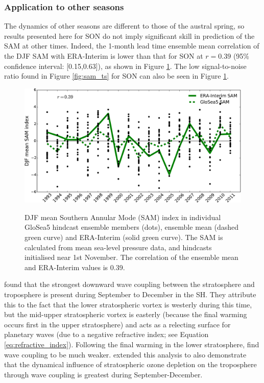 \subsubsection{Application to other seasons}

The dynamics of other seasons are different to those of the austral spring, so
results presented here for SON do not imply significant skill in prediction of
the SAM at other times. Indeed, the 1-month lead time ensemble mean correlation
of the DJF SAM with ERA-Interim is lower than that for SON at $r=0.39$ (95\%
confidence interval: [0.15,0.63]), as shown in Figure \ref{fig:djf_sam_ts}. The
low signal-to-noise ratio found in Figure \ref{fig:sam_ts} for SON can also be
seen in Figure \ref{fig:djf_sam_ts}. 

\begin{figure}[t]
  \noindent\includegraphics[width=\textwidth,angle=0]{figures/chapter-seasonal/DJF_SAM.pdf}\\
  \caption[GloSea5 predictions of the SAM.]{DJF mean Southern Annular Mode (SAM)
    index in individual GloSea5 hindcast ensemble members (dots), ensemble mean
    (dashed green curve) and ERA-Interim (solid green curve). The SAM is
    calculated from mean sea-level pressure data, and hindcasts initialised near
    1st November. The correlation of the ensemble mean and ERA-Interim values is
    0.39.}\label{fig:djf_sam_ts}
\end{figure}

\citet{Shaw2010} found that the strongest downward wave coupling between the
stratosphere and troposphere is present during September to December in the
SH. They attribute this to the fact that the lower stratospheric vortex is
westerly during this time, but the mid-upper stratospheric vortex is easterly
(because the final warming occurs first in the upper stratosphere) and acts as a
relecting surface for planetary waves (due to a negative refractive index; see
Equation \ref{eq:refractive_index}). Following the final warming in the lower
stratosphere, \citet{Shaw2010} find wave coupling to be much
weaker. \citet{Shaw2011} extended this analysis to also demonstrate that the
dynamical influence of stratospheric ozone depletion on the troposphere through
wave coupling is greatest during September-December. 

